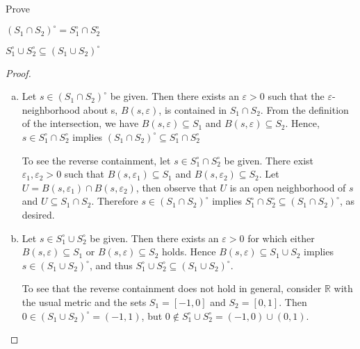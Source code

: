 \documentclass[10pt]{amsart}
\begin{document}
\begin{ex13}{}
  Prove\\
  \begin{inparaenum}[(a)]
  \item\label{13a}
    $(S_1 \cap S_2)^\circ = S_1^\circ \cap S_2^\circ$\hspace{10mm}
  \item\label{13b}
    $S_1^\circ \cup S_2^\circ \subseteq (S_1 \cup S_2)^\circ$
  \end{inparaenum}
  
  \begin{proof}
  \begin{enumerate}[(a)]
	\item
		Let $s \in (S_1 \cap S_2)^\circ$ be given.
		Then there exists an $\varepsilon > 0$ such that the $\varepsilon$-neighborhood about s, $B(s,\varepsilon)$, is contained in $S_1 \cap S_2$.
		From the definition of the intersection, we have $B(s,\varepsilon) \subseteq S_1$ and $B(s,\varepsilon) \subseteq S_2$.
		Hence, $s \in S_1^\circ \cap S_2^\circ$ implies $(S_1 \cap S_2)^\circ \subseteq S_1^\circ \cap S_2^\circ$
		
		To see the reverse containment, let $s \in S_1^\circ \cap S_2^\circ$ be given.
		There exist $\varepsilon_1, \varepsilon_2 > 0$ such that $B(s,\varepsilon_1) \subseteq S_1$ and $B(s,\varepsilon_2) \subseteq S_2$.
		Let $U = B(s,\varepsilon_1) \cap B(s,\varepsilon_2)$, then observe that $U$ is an open neighborhood of $s$ and $U \subseteq S_1 \cap S_2$.
		Therefore $s \in (S_1 \cap S_2)^\circ$ implies $S_1^\circ \cap S_2^\circ \subseteq (S_1 \cap S_2)^\circ$, as desired.
	\item
		Let $s \in S_1^\circ \cup S_2^\circ$ be given.
		Then there exists an $\varepsilon > 0$ for which either $B(s,\varepsilon) \subseteq S_1$ or $B(s,\varepsilon) \subseteq S_2$ holds.
		Hence $B(s,\varepsilon) \subseteq S_1 \cup S_2$ implies $s \in (S_1 \cup S_2)^\circ$, and thus $S_1^\circ \cup S_2^\circ \subseteq (S_1 \cup S_2)^\circ$.
		
		To see that the reverse containment does not hold in general, consider $\mathbb{R}$ with the usual metric and the sets $S_1 = [-1,0]$ and $S_2 = [0,1]$.  
		Then $0 \in (S_1 \cup S_2)^\circ = (-1,1)$, but $0 \not \in S_1^\circ \cup S_2^\circ = (-1,0) \cup (0,1)$.
  \end{enumerate}
  \end{proof}
\end{ex13}{}
\end{document}
